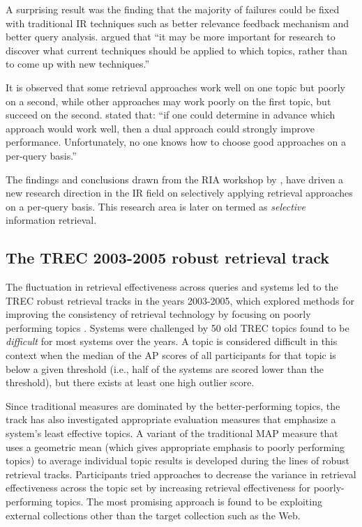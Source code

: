 A surprising result was the finding that the majority of failures could be fixed with traditional IR techniques such as better relevance feedback mechanism and better query analysis. 
\citet{ria} argued that ``it may be more important for research to discover what current techniques should be applied to which topics, rather than to come up with new techniques.''

It is observed that some retrieval approaches work well on one topic but poorly on a second, while other approaches may work poorly on the first topic, but succeed on the second.
\citet{IRFail} stated that: ``if one could determine in advance which approach would work well, then a dual approach could strongly improve performance. 
Unfortunately, no one knows how to choose good approaches on a per-query basis.''

The findings and conclusions drawn from the RIA workshop by \citet{ria2,ria}, have driven a new research direction in the IR field on selectively applying retrieval approaches on a per-query basis.
This research area is later on termed as \emph{selective} information retrieval.

\subsection{The TREC 2003-2005 robust retrieval track}
The fluctuation in retrieval effectiveness across queries and systems led to the TREC robust retrieval tracks in the years 2003-2005, which explored methods for improving the consistency of retrieval technology by focusing on poorly performing topics \citep{robust}.
Systems were challenged by 50 old TREC topics found to be \emph{difficult} for most systems over the years. 
A topic is considered difficult in this context when the median of the AP scores of all participants for that topic is below a given threshold 
(i.e., half of the systems are scored lower than the threshold), but there exists at least one high outlier score.

Since traditional measures are dominated by the better-performing topics, the track has also investigated appropriate evaluation measures that emphasize a system's least effective topics.  
A variant of the traditional MAP measure that uses a geometric mean (which gives appropriate emphasis to poorly performing topics) to average individual topic results is developed during the lines of robust retrieval tracks.
Participants tried approaches to decrease the variance in retrieval effectiveness across the topic set by increasing retrieval effectiveness for poorly-performing topics.
The most promising approach is found to be exploiting external collections other than the target collection such as the Web. 

